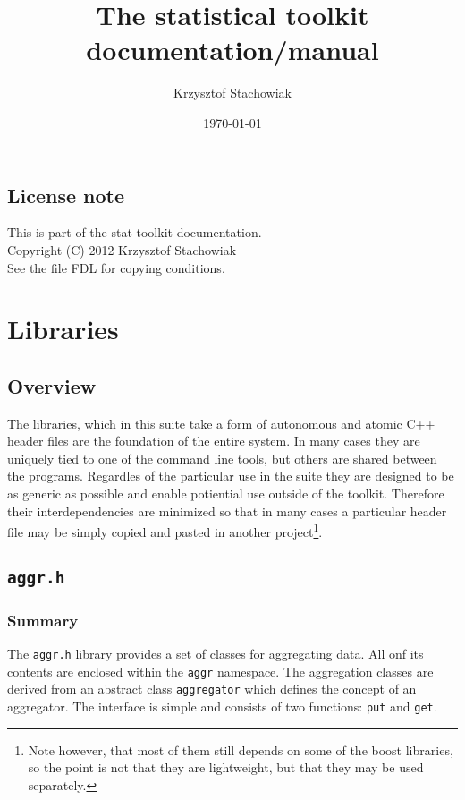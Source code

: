 \documentclass{report}
\begin{document}
\title{The statistical toolkit documentation/manual}
\author{Krzysztof Stachowiak}
\date{\today}

\maketitle

\tableofcontents

\section*{License note}
This is part of the stat-toolkit documentation.\\
Copyright (C) 2012 Krzysztof Stachowiak\\
See the file FDL for copying conditions.

\chapter{Libraries}


\section{Overview}
The libraries, which in this suite take a form of autonomous and atomic C++
header files are the foundation of the entire system. In many cases they are
uniquely tied to one of the command line tools, but others are shared between
the programs. Regardles of the particular use in the suite they are designed to
be as generic as possible and enable potiential use outside of the toolkit.
Therefore their interdependencies are minimized so that in many cases a
particular header file may be simply copied and pasted in another
project\footnote{Note however, that most of them still depends on some of the boost
libraries, so the point is not that they are lightweight, but that they may be
used separately.}.

\section{\texttt{aggr.h}}

	\subsection{Summary}
	The \texttt{aggr.h} library provides a set of classes for aggregating data.
	All onf its contents are enclosed within the \texttt{aggr} namespace. The
	aggregation classes are derived from an abstract class \texttt{aggregator}
	which defines the concept of an aggregator. The interface is simple and
	consists of two functions: \texttt{put} and \texttt{get}.
\end{document}
